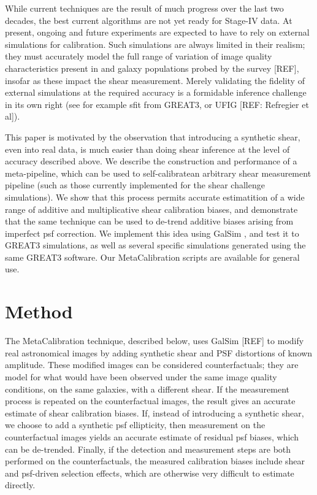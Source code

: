 \documentclass[iop]{emulateapj}
\begin{document}
While current techniques are the result of much progress over the last two decades, the best current algorithms are not yet ready for Stage-IV data. At present, ongoing and future experiments are expected to have to rely on external simulations for calibration. Such simulations are always limited in their realism; they must accurately model the full range of variation of image quality characteristics present in and galaxy populations probed by the survey [REF], insofar as these impact the shear measurement. Merely validating the fidelity of external simulations at the required accuracy is a formidable inference challenge in its own right (see for example sfit from GREAT3, or UFIG [REF: Refregier et al]).

This paper is motivated by the observation that introducing a synthetic shear, even into real data, is much easier than doing shear inference at the level of accuracy described above. We describe the construction and performance of a meta-pipeline, which can be used to self-calibratean arbitrary shear measurement pipeline  (such as those currently implemented for the shear challenge simulations). We show that this process permits accurate estimatition of a wide range of additive and multiplicative shear calibration biases, and demonstrate that the same technique can be used to de-trend additive biases arising from imperfect psf correction. We implement this idea using GalSim \citep{2015A&C....10..121R}, and test it to GREAT3 simulations, as well as several specific simulations generated using the same GREAT3 software. Our MetaCalibration scripts are available for general use.

\section{Method}
The MetaCalibration technique, described below, uses GalSim [REF] to modify real astronomical images by adding synthetic shear and PSF distortions of known amplitude. These modified images can be considered counterfactuals;  they are model for what would have been observed under the same image quality conditions, on the same galaxies, with a different shear. If the measurement process is repeated on the counterfactual images, the result gives an accurate estimate of shear calibration biases. If, instead of introducing a synthetic shear, we choose to add a synthetic psf ellipticity, then measurement on the counterfactual images yields an accurate estimate of residual psf biases, which can be de-trended. Finally, if the detection and measurement steps are both performed on the counterfactuals, the measured calibration biases include shear and psf-driven selection effects, which are otherwise very difficult to estimate directly.
\end{document}
